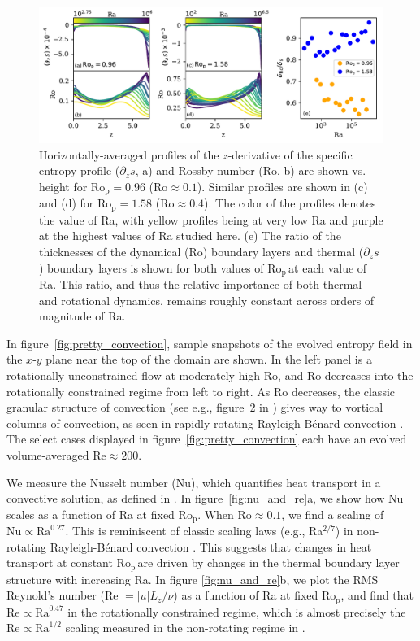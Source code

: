 \documentclass[twocolumn, amsmath, amsfonts, amssymb]{aastex62}
\newcommand{\RB}{Rayleigh-B\'{e}nard }
\newcommand{\pro}{\ensuremath{\text{Ro}_{\text{p}}}}
\begin{document}
\begin{figure}[ht!]
    \includegraphics[width=\textwidth]{boundary_layers.pdf}
    \caption{Horizontally-averaged profiles of the $z$-derivative of 
    the specific entropy profile ($\partial_z s$, a) and Rossby number (Ro, b) 
    are shown vs. height for $\pro = 0.96$ ($\text{Ro} \approx 0.1$). 
    Similar profiles are shown in (c) and (d) for $\pro = 1.58$ ($\text{Ro} \approx 0.4$). The color of the profiles
    denotes the value of Ra, with yellow profiles being at very low Ra and purple at the highest
    values of Ra studied here.
    (e) The ratio of the thicknesses of the dynamical (Ro) boundary layers and 
    thermal ($\partial_z s$) boundary layers is shown for both values of \pro$\,$at each value of Ra.
    This ratio, and thus the relative importance of both thermal and rotational dynamics,
	remains roughly constant across orders of magnitude of Ra.
    \label{fig:profiles_and_bls} }
\end{figure}

In figure~\ref{fig:pretty_convection}, sample snapshots
of the evolved entropy field in the $x$-$y$ plane near the top of the domain are shown. 
In the left panel is a rotationally unconstrained flow at moderately high
Ro, and Ro decreases into the rotationally constrained regime from left to right.
As Ro decreases, the
classic granular structure of convection (see e.g., figure~2 in \AB) gives way to vortical
columns of convection, as seen in rapidly rotating \RB convection \citep{stellmach&all2014}.
The select cases displayed in figure~\ref{fig:pretty_convection} each have an evolved volume-averaged
$\text{Re} \approx 200$.

We measure the Nusselt number (Nu), which quantifies heat transport in a convective
solution, as defined in \AB.
In figure~\ref{fig:nu_and_re}a, we show how Nu scales as a function
of Ra at fixed \pro. When $\text{Ro} \approx 0.1$,
we find a scaling of $\text{Nu} \propto \text{Ra}^{0.27}$. This is reminiscent of
classic scaling laws (e.g., Ra$^{2/7}$) in non-rotating \RB convection \citep{ahlers&all2009}.
This suggests that changes in heat transport at constant \pro$\,$are driven by
changes in the thermal boundary layer structure with increasing Ra.
In figure \ref{fig:nu_and_re}b, we plot the RMS Reynold's
number (Re $= |u| L_z / \nu$) as a function of Ra at fixed \pro, and find that 
$\text{Re} \propto \text{Ra}^{0.47}$ in the rotationally constrained regime,
which is almost precisely the $\text{Re} \propto \text{Ra}^{1/2}$ scaling measured
in the non-rotating regime in \AB.
\end{document}
